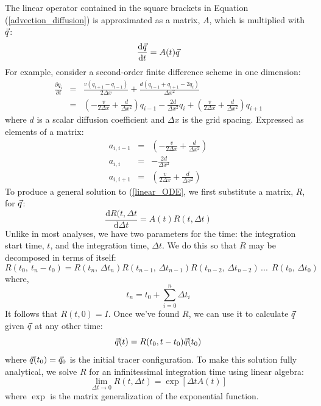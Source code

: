 \documentclass{article}
\begin{document}
The linear operator contained in the square brackets in Equation 
(\ref{advection_diffusion}) is approximated as a matrix, $A$, which is 
multiplied with $\vec q$:
\begin{equation}
\frac{\mathrm d \vec q}{\mathrm d t} = A(t) \vec q
\label{linear_ODE}
\end{equation}
For example, consider a second-order finite difference scheme in one dimension:
\begin{eqnarray}
\frac{\partial q_i}{\partial t} & = & \frac{v(q_{i+1} - q_{i-1})}{2 \Delta x} +
	\frac{d (q_{i-1} + q_{i+1} - 2 q_i)}{\Delta x^2} \\
& = & \left (- \frac{v}{2 \Delta x} + \frac{d}{\Delta x^2} \right ) q_{i-1} -
	\frac{2 d}{\Delta x^2} q_i + 
	\left (\frac{v}{2 \Delta x} + \frac{d}{\Delta x^2} \right ) q_{i+1} \label{finite_difference_diffusion}
\end{eqnarray}
where $d$ is a scalar diffusion coefficient and $\Delta x$ is the grid spacing.
Expressed as elements of a matrix:
\begin{eqnarray}
a_{i,i-1} & = & \left (- \frac{v}{2 \Delta x} + \frac{d}{\Delta x^2} \right ) \\
	a_{i,i} & = & -\frac{2 d}{\Delta x^2} \\
a_{i,i+1} & = & \left (\frac{v}{2 \Delta x} + \frac{d}{\Delta x^2} \right )
\end{eqnarray}
To produce a general solution to (\ref{linear_ODE}, 
we first substitute a matrix, $R$, for $\vec q$:
\begin{equation}
	\frac{\mathrm d R(t, \Delta t}{\mathrm d \Delta t} = A(t) R(t, \Delta t)
\end{equation}
Unlike in most analyses, we have two parameters for the time:
the integration start time, $t$, and the integration time, $\Delta t$.
We do this so that $R$ may be decomposed in terms of itself:
\begin{equation}
	R(t_0,~t_n-t_0) = R(t_n, \, \Delta t_n) R(t_{n-1},\,\Delta t_{n-1}) R(t_{n-2},\,\Delta t_{n-2}) \, ...~~ 
	R(t_0,\,\Delta t_0)
\label{matrix_soln_decomposition}
\end{equation}
where,
\begin{equation}
t_n=t_0+\sum_{i=0}^{n} \Delta t_i
\end{equation}
It follows that $R(t, 0)=I$.
Once we've found $R$, 
we can use it to calculate $\vec q$ given $\vec q$ at any other time:
\begin{equation}
	\vec q(t) = R(t_0, t-t_0) \vec q(t_0)
\end{equation}
where $\vec q(t_0)=\vec q_0$ is the initial tracer configuration.
To make this solution fully analytical, we solve $R$ for an infinitessimal
integration time using linear algebra:
\begin{equation}
	\lim_{\Delta t \rightarrow 0} R(t, \Delta t) = \exp \left [ \Delta t A(t) \right ]
\end{equation}
where $\exp$ is the matrix generalization of the exponential function.
\end{document}
